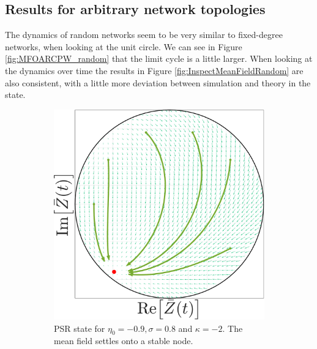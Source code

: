 \subsection{Results for arbitrary network topologies} \label{sec:resArbNetw}
The dynamics of random networks seem to be very similar to fixed-degree networks, when looking at the unit circle. We can see in Figure \ref{fig:MFOARCPW_random} that the limit cycle is a little larger. When looking at the dynamics over time the results in Figure \ref{fig:InspectMeanFieldRandom} are also consistent, with a little more deviation between simulation and theory in the \CPW state.
\begin{figure}[H]
\centering
\begin{subfigure}[b]{0.32\linewidth}
   \centering
  \includegraphics[width=\linewidth]{../Figures/PhaseSpace/MFOARPSR_random.pdf}
   \caption{PSR state for $\eta_0 = -0.9, \sigma = 0.8$ and $\kappa= -2$. The mean field settles onto a stable node.}
   \label{fig:MFOARPSR_random} 
\end{subfigure} \hfill
\begin{subfigure}[b]{0.32\linewidth}
   \centering

\end{subfigure}
\end{figure}
